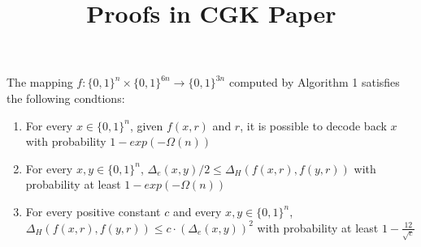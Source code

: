 \documentclass{article}
\title{Proofs in CGK Paper}
\author{}
\date{}
\begin{document}
\maketitle

\begin{theorem} 
    The mapping $f:\{0,1\}^n \times \{0,1\}^{6n} \rightarrow \{0,1\}^{3n}$ 
    computed by Algorithm 1 satisfies the following condtions:
    \begin{enumerate}
        \item For every $x \in \{0,1\}^n$, given $f(x,r)$ and $r$, it is possible
        to decode back $x$ with probability $1-exp(-\Omega(n))$
        \item For every $x,y \in \{0,1\}^n$, $\Delta_e(x,y)/2 \leq \Delta_H(f(x,r),f(y,r))$
        with probability at least  $1-exp(-\Omega(n))$
        \item For every positive constant $c$ and every $x,y \in \{0,1\}^n$, 
        $\Delta_H(f(x,r),f(y,r))\leq c \cdot(\Delta_e(x,y))^2$ with probability
        at least $1-\frac{12}{\sqrt{c}}$
    \end{enumerate}
\end{theorem}
\end{document}
